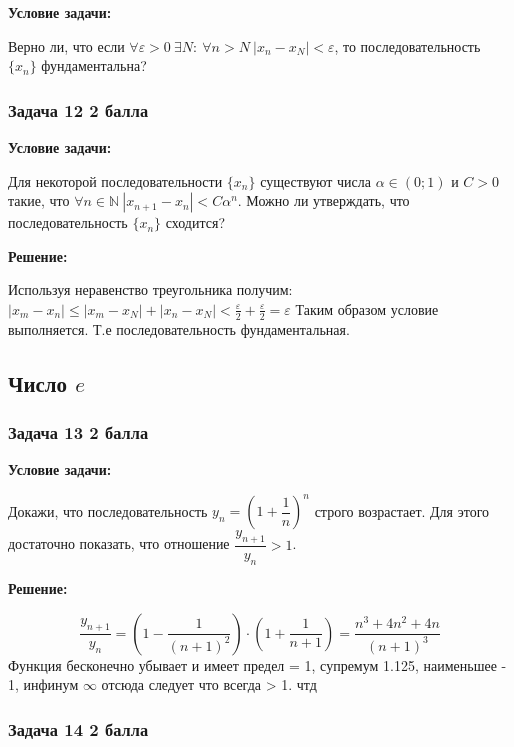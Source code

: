 \documentclass[a4paper,12pt]{article}
\begin{document}
\textbf{Условие задачи:}

Верно ли, что если \( \forall \varepsilon > 0 \ \exists N : \ \forall n > N \ |x_n - x_N| < \varepsilon \), то последовательность \( \{ x_n \} \) фундаментальна?

\vspace{1cm}

\subsubsection{Задача 12 \hfill 2 балла}

\textbf{Условие задачи:}

Для некоторой последовательности \( \{ x_n \} \) существуют числа \( \alpha \in (0; 1) \) и \( C > 0 \) такие, что \( \forall n \in \mathbb{N} \ |x_{n+1} - x_n| < C \alpha^n \). Можно ли утверждать, что последовательность \( \{ x_n \} \) сходится?

\textbf{Решение:}

Используя неравенство треугольника получим: $   |x_m - x_n| \leq |x_m - x_N| + |x_n - x_N| < \frac{\varepsilon}{2} + \frac{\varepsilon}{2} = \varepsilon$ Таким образом условие выполняется. Т.е последовательность фундаментальная.

\vspace{1cm}

\subsection{Число \( e \)}

\subsubsection{Задача 13 \hfill 2 балла}

\textbf{Условие задачи:}

Докажи, что последовательность \( y_n = \left( 1 + \dfrac{1}{n} \right)^n \) строго возрастает. Для этого достаточно показать, что отношение \( \dfrac{y_{n+1}}{y_n} > 1 \).

\textbf{Решение: }

\[
\frac{y_{n+1}}{y_n} = (1-\frac{1}{(n+1)^2})\cdot (1+\frac{1}{n+1})=\frac{n^3+4n^2+4n}{(n+1)^3}
\]
Функция бесконечно убывает и имеет предел = 1, супремум 1.125, наименьшее - 1, инфинум $\infty$ отсюда следует что всегда > 1. чтд
\vspace{1cm}

\subsubsection{Задача 14 \hfill 2 балла}
\end{document}
